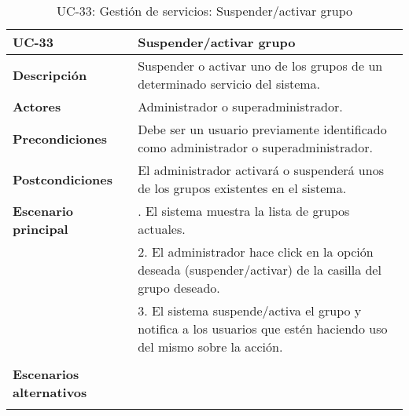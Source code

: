\begin{table}[H]
  \begin{center}
    \begin{tabularx}{16.4cm}{|l|X|}
      \hline
      \textbf{UC-33} & \textbf{Suspender/activar grupo}\\
      \hline
      \textbf{Descripción} & Suspender o activar uno de los grupos de un determinado servicio del sistema.\\
      \hline
      \textbf{Actores} & Administrador o superadministrador.\\
      \hline
      \textbf{Precondiciones} & Debe ser un usuario previamente identificado como administrador o superadministrador.\\
      \hline
      \textbf{Postcondiciones} & El administrador activará o suspenderá unos de los grupos existentes en el sistema.\\
      \hline
      \textbf{Escenario principal} & \smallskip 1. El sistema muestra la lista de grupos actuales.\\
      & 2. El administrador hace click en la opción deseada (suspender/activar) de la casilla del grupo deseado.\\
      & 3. El sistema suspende/activa el grupo y notifica a los usuarios que estén haciendo uso del mismo sobre la acción.\\
      & \\
      \hline
      \textbf{Escenarios alternativos} & \smallskip \\
      & \\
      \hline
    \end{tabularx}
    \caption{UC-33: Gestión de servicios: Suspender/activar grupo}
  \end{center}
\end{table}


